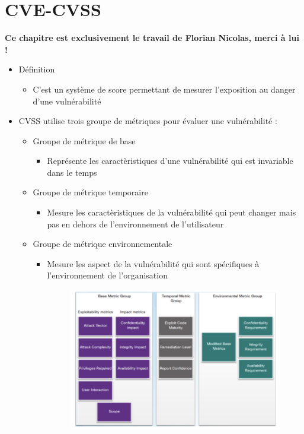 \documentclass[a4paper]{article}
\begin{document}
\section{CVE-CVSS}
\textbf{Ce chapitre est exclusivement le travail de Florian Nicolas, merci à lui !}
\begin{itemize}[label=\textbullet, font=\Large]
  \item Définition
  \begin{itemize}[label=, font=\scriptsize]
    \item C’est un système de score permettant de mesurer l’exposition au danger d’une vulnérabilité
  \end{itemize}
  \item CVSS utilise trois groupe de métriques pour évaluer une vulnérabilité :
  \begin{itemize}[label=, font=\scriptsize]
    \item Groupe de métrique de base
    \begin{itemize}
      \item Représente les caractèristiques d'une vulnérabilité qui est invariable dans le temps
    \end{itemize}
    \item Groupe de métrique temporaire
    \begin{itemize}
      \item Mesure les caractèristiques de la vulnérabilité qui peut changer mais pas en dehors de l'environnement de l'utilisateur
    \end{itemize}
    \item Groupe de métrique environnementale
    \begin{itemize}
      \item Mesure les aspect de la vulnérabilité qui sont spécifiques à l'environnement de l'organisation
      \begin{figure}[H]
        \centering
        \includegraphics[width=12cm]{images/CVSS.PNG}

\end{figure}
\end{itemize}
\end{itemize}
\end{itemize}
\end{document}
